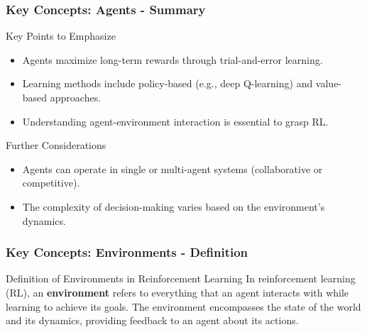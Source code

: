 \documentclass{beamer}
\begin{document}
\begin{frame}[fragile]
    \frametitle{Key Concepts: Agents - Summary}
    \begin{block}{Key Points to Emphasize}
        \begin{itemize}
            \item Agents maximize long-term rewards through trial-and-error learning.
            \item Learning methods include policy-based (e.g., deep Q-learning) and value-based approaches.
            \item Understanding agent-environment interaction is essential to grasp RL.
        \end{itemize}
    \end{block}
    \begin{block}{Further Considerations}
        \begin{itemize}
            \item Agents can operate in single or multi-agent systems (collaborative or competitive).
            \item The complexity of decision-making varies based on the environment's dynamics.
        \end{itemize}
    \end{block}
\end{frame}

\begin{frame}[fragile]
    \frametitle{Key Concepts: Environments - Definition}
    \begin{block}{Definition of Environments in Reinforcement Learning}
        In reinforcement learning (RL), an \textbf{environment} refers to everything that an agent interacts with while learning to achieve its goals. 
        The environment encompasses the state of the world and its dynamics, providing feedback to an agent about its actions.
    \end{block}
\end{frame}
\end{document}
